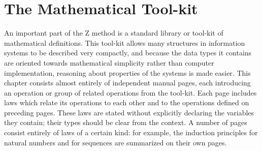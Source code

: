 


\chapter{The Mathematical Tool-kit}\label{c:library}

\def\blank{\quad$\diamond$}


An important part of the Z method is a standard library or tool-kit
of mathematical definitions.  This
tool-kit allows many structures in information systems to be
described very compactly, and because the data types it contains are
oriented towards mathematical simplicity rather than computer
implementation, reasoning about properties of the systems is made
easier.  This chapter consists almost entirely of independent manual
pages, each introducing an operation or group of related operations
from the tool-kit. Each page includes laws which relate its
operations to each other and to the operations defined on preceding
pages.  These laws are stated without explicitly declaring the
variables they contain; their types should be clear from the
context.  A number of pages consist entirely of laws of a certain
kind: for example, the induction principles for natural numbers and
for sequences are summarized on their own pages.

